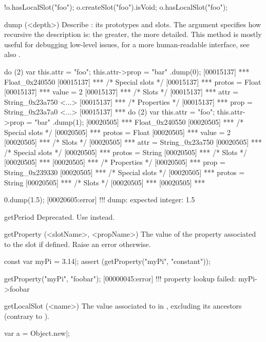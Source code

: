 \begin{urbiscriptapi}
\begin{urbiassert}
!o.hasLocalSlot("foo");
 o.createSlot("foo").isVoid;
 o.hasLocalSlot("foo");
\end{urbiassert}

\item[dump](<depth>)%
  Describe \this: its prototypes and slots.  The argument 
  specifies how recursive the description is: the greater, the more
  detailed.  This method is mostly useful for debugging low-level issues,
  for a more human-readable interface, see also .
\begin{urbiscript}
do (2) { var this.attr = "foo"; this.attr->prop = "bar" }.dump(0);
[00015137] *** Float_0x240550 {
[00015137] ***   /* Special slots */
[00015137] ***   protos = Float
[00015137] ***   value = 2
[00015137] ***   /* Slots */
[00015137] ***   attr = String_0x23a750 <...>
[00015137] ***     /* Properties */
[00015137] ***     prop = String_0x23a7a0 <...>
[00015137] ***   }
do (2) { var this.attr = "foo"; this.attr->prop = "bar" }.dump(1);
[00020505] *** Float_0x240550 {
[00020505] ***   /* Special slots */
[00020505] ***   protos = Float
[00020505] ***   value = 2
[00020505] ***   /* Slots */
[00020505] ***   attr = String_0x23a750 {
[00020505] ***     /* Special slots */
[00020505] ***     protos = String
[00020505] ***     /* Slots */
[00020505] ***     }
[00020505] ***     /* Properties */
[00020505] ***     prop = String_0x239330 {
[00020505] ***       /* Special slots */
[00020505] ***       protos = String
[00020505] ***       /* Slots */
[00020505] ***       }
[00020505] ***   }

0.dump(1.5);
[00020605:error] !!! dump: expected integer: 1.5
\end{urbiscript}

\item[getPeriod]%
  Deprecated.  Use  instead.

\item[getProperty](<slotName>, <propName>)%
  The value of the  property associated to the slot
   if defined.  Raise an error otherwise.
\begin{urbiscript}
const var myPi = 3.14|;
assert (getProperty("myPi", "constant"));

getProperty("myPi", "foobar");
[00000045:error] !!! property lookup failed: myPi->foobar
\end{urbiscript}

\item[getLocalSlot](<name>)%
  The value associated to  in \this, excluding its ancestors
  (contrary to ).
\begin{urbiscript}
var a = Object.new|;


\end{urbiscript}
\end{urbiscriptapi}
